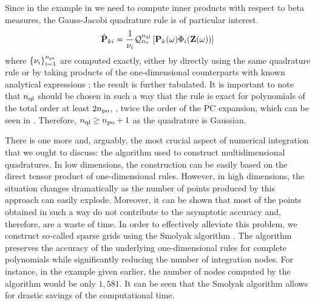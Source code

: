 Since in the example in  we need to compute inner products with respect to beta measures, the Gauss-Jacobi quadrature rule is of particular interest.
\[
  \hat{\mathbf{P}}_{ki} = \frac{1}{\nu_i} \mathcal{Q}_{{n_\text{v}}}^{{n_\text{ql}}}\left[\mathbf{P}_k(\omega) \Phi_i(\mathbf{Z}(\omega))\right]
\]
where $\{ \nu_i \}_{i = 1}^{{n_\text{pt}}}$ are computed exactly, either by directly using the same quadrature rule or by taking products of the one-dimensional counterparts with known analytical expressions \cite{xiu2010}; the result is further tabulated.
It is important to note that ${n_\text{ql}}$ should be chosen in such a way that the rule is exact for polynomials of the total order at least $2 {n_\text{po}}$, \ie, twice the order of the PC expansion, which can be seen in  \cite{eldred2008}.
Therefore, ${n_\text{ql}} \geq {n_\text{po}} + 1$ as the quadrature is Gaussian.

There is one more and, arguably, the most crucial aspect of numerical integration that we ought to discuss: the algorithm used to construct multidimensional quadratures.
In low dimensions, the construction can be easily based on the direct tensor product of one-dimensional rules.
However, in high dimensions, the situation changes dramatically as the number of points produced by this approach can easily explode.
Moreover, it can be shown that most of the points obtained in such a way do not contribute to the asymptotic accuracy and, therefore, are a waste of time.
In order to effectively alleviate this problem, we construct so-called sparse grids using the Smolyak algorithm \cite{eldred2008, heiss2008, burkardt2013}.
The algorithm preserves the accuracy of the underlying one-dimensional rules for complete polynomials while significantly reducing the number of integration nodes.
For instance, in the example given earlier, the number of nodes computed by the algorithm would be only $1,581$.
It can be seen that the Smolyak algorithm allows for drastic savings of the computational time.
